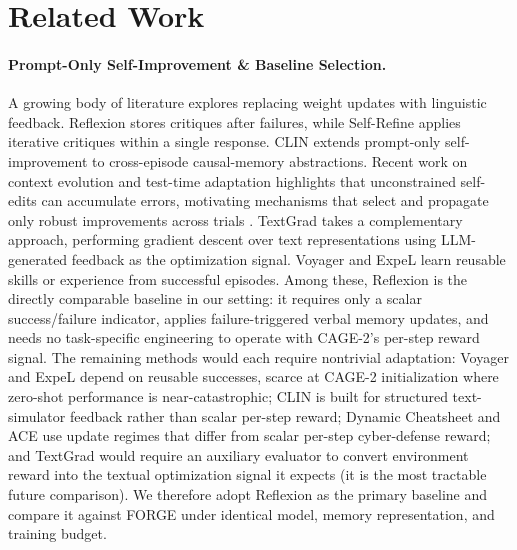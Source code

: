 \documentclass[sigconf]{acmart}
\begin{document}
\section{Related Work}
\paragraph{Prompt-Only Self-Improvement \& Baseline Selection.} A growing body of literature explores replacing weight updates with linguistic feedback. Reflexion \citep{shinn2023reflexion} stores critiques after failures, while Self-Refine \citep{madaan2023selfrefine} applies iterative critiques within a single response. CLIN \citep{majumder2024clin} extends prompt-only self-improvement to cross-episode causal-memory abstractions. Recent work on context evolution and test-time adaptation highlights that unconstrained self-edits can accumulate errors, motivating mechanisms that select and propagate only robust improvements across trials \citep{zhang2025ace,suzgun2025cheatsheet}. TextGrad \citep{yuksekgonul2024textgradautomaticdifferentiationtext} takes a complementary approach, performing gradient descent over text representations using LLM-generated feedback as the optimization signal. Voyager \citep{wang2023voyager} and ExpeL \citep{zhao2024expel} learn reusable skills or experience from successful episodes. Among these, Reflexion is the directly comparable baseline in our setting: it requires only a scalar success/failure indicator, applies failure-triggered verbal memory updates, and needs no task-specific engineering to operate with CAGE-2's per-step reward signal. The remaining methods would each require nontrivial adaptation: Voyager and ExpeL depend on reusable successes, scarce at CAGE-2 initialization where zero-shot performance is near-catastrophic; CLIN is built for structured text-simulator feedback rather than scalar per-step reward; Dynamic Cheatsheet \citep{suzgun2025cheatsheet} and ACE \citep{zhang2025ace} use update regimes that differ from scalar per-step cyber-defense reward; and TextGrad would require an auxiliary evaluator to convert environment reward into the textual optimization signal it expects (it is the most tractable future comparison). We therefore adopt Reflexion as the primary baseline and compare it against FORGE under identical model, memory representation, and training budget.
\end{document}
